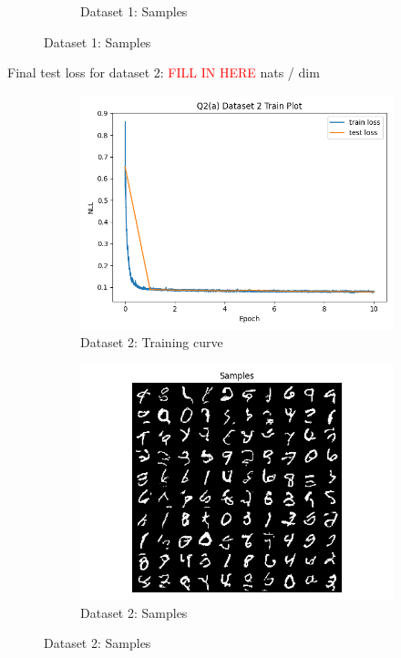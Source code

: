 \documentclass{article}
\begin{document}
\begin{enumerate}[(a)]
\begin{figure}[H]
\begin{subfigure}{0.45\textwidth}
        \caption{Dataset 1: Samples}
    \end{subfigure}
\end{figure}
Final test loss for dataset 2: \textcolor{red}{FILL IN HERE}  nats / dim
\begin{figure}[H]
    \centering
    \begin{subfigure}{0.45\textwidth}
        \centering
        \includegraphics[width=\textwidth]{figures/q2_a_dset2_train_plot.png}
        \caption{Dataset 2: Training curve}
    \end{subfigure}
    \hspace{0.2in}
    \begin{subfigure}{0.45\textwidth}
        \centering
        \includegraphics[width=\textwidth]{figures/q2_a_dset2_samples.png}
        \caption{Dataset 2: Samples}
    \end{subfigure}
\end{figure}


\end{enumerate}
\end{document}

